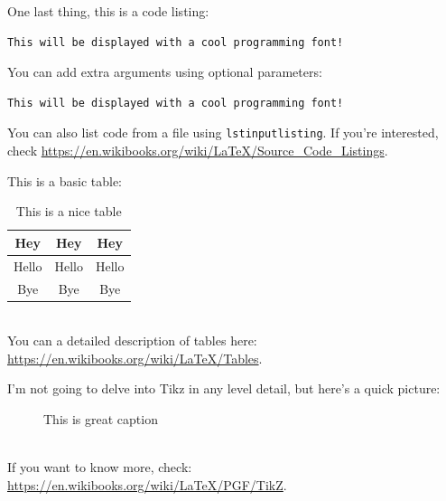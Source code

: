 \documentclass[reprint,english,notitlepage]{revtex4-2}  %
\begin{document}
One last thing, this is a code listing:
\begin{lstlisting}
This will be displayed with a cool programming font!
\end{lstlisting}
You can add extra arguments using optional parameters:
\begin{lstlisting}[morekeywords={cool}]
This will be displayed with a cool programming font!
\end{lstlisting}
You can also list code from a file using \texttt{lstinputlisting}. If you're interested, check \url{https://en.wikibooks.org/wiki/LaTeX/Source_Code_Listings}.

This is a basic table:
\begin{table}[h]  %
\caption{This is a nice table}\label{table}
\begin{tabular}{|c|c|c|} %
\hline                    %
Hey & Hey & Hey  \\
\hline
Hello & Hello & Hello \\
\hline
Bye & Bye & Bye \\
\hline
\end{tabular}
\end{table}\\
You can a detailed description of tables here: \url{https://en.wikibooks.org/wiki/LaTeX/Tables}.

I'm not going to delve into Tikz in any level detail, but here's a quick picture:
\begin{figure}[h]
\centering  %
\caption{This is great caption}\label{figure}
\end{figure}\\
If you want to know more, check: \url{https://en.wikibooks.org/wiki/LaTeX/PGF/TikZ}.

\end{document}
